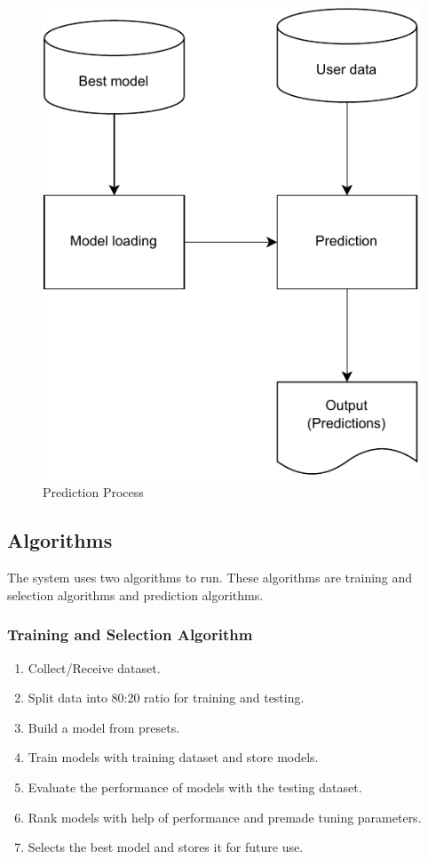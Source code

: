\begin{figure}[ht]
    \centering
    \includegraphics[width=0.6\columnwidth]{media/sec03/prediction.pdf}
    \caption{Prediction Process}
    \label{fig:prediction_process}
\end{figure}

\subsection{Algorithms}\label{subsec:algorithms}

The system uses two algorithms to run. These algorithms are training and selection algorithms and prediction algorithms.

\vspace{-0.5em}
\subsubsection*{Training and Selection Algorithm}\label{subsubsec:training_and_selection_algorithm}
\vspace{0.5em}
\begin{enumerate}
    \item Collect/Receive dataset.
    \item Split data into 80:20 ratio for training and testing.
    \item Build a model from presets.
    \item Train models with training dataset and store models.
    \item Evaluate the performance of models with the testing dataset.
    \item Rank models with help of performance and premade tuning parameters.
    \item Selects the best model and stores it for future use.
\end{enumerate}

